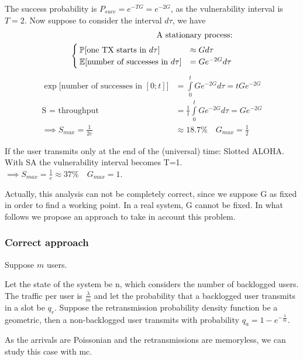 The success probability is $P_{succ} = e^{-T G} = e^{-2 G}$, as the vulnerability interval is $T=2$.
Now suppose to consider the interval $d\tau$, we have
\begin{equation}\begin{split}
	\text{A stationary process:} \\
	\begin{cases}
		\mathbb{P}[\text{one TX starts in $d\tau$}] &\approx G d\tau\\
		\mathbb{E}[\text{number of successes in $d\tau$}] &= G e^{-2 G} d\tau \\
	\end{cases}
	\end{split}
	\end{equation}
	\begin{equation}\begin{split}
	\exp\bigg[\text{number of successes in $[0;t]$}\bigg] &= \int\limits_0^t G e^{-2 G}d\tau = t G e^{-2 G}\\
	\text{S = throughput }&=\frac{1}{t} \int\limits_0^t G e^{-2 G}d\tau = G e^{-2 G}\\
	\implies S_{max} = \frac{1}{2e}& \approx 18.7\% \quad G_{max} = \frac{1}{2}
\end{split}\end{equation}

If the user transmits only at the end of the (universal) time: Slotted ALOHA.
With SA the vulnerability interval becomes T=1. $\implies S_{max}=\frac{1}{e} \approx 37\% \quad G_{max} = 1$.

Actually, this analysis can not be completely correct, since we suppose G as fixed in order to find a working point. In a real system, G cannot be fixed. In what follows we propose an approach to take in account this problem.

\subsubsection{Correct approach}

Suppose $m$ users.

Let the state of the system be n, which considers the number of backlogged users.
The traffic per user is $\frac{\lambda}{m}$ and let the probability that a backlogged user transmits in a slot be $q_r$. Suppose the retransmission probability density function be a geometric, then a non-backlogged user transmits with probability $q_a = 1-e^{-\frac{\lambda}{m}}$.

As the arrivals are Poissonian and the retransmissions are memoryless, we can study this case with \gls{mc}.

